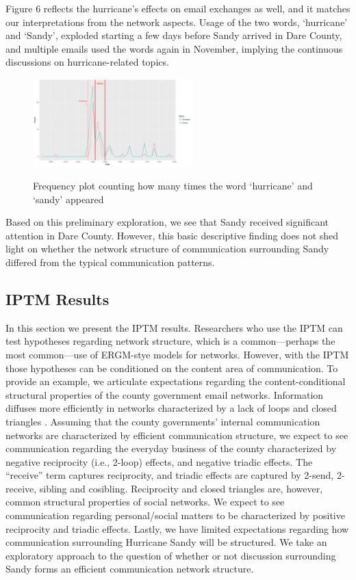 Figure 6 reflects the hurricane's effects on email exchanges as well, and it matches our interpretations from the network aspects. Usage of the two words, `hurricane' and `Sandy', exploded starting a few days before Sandy arrived in Dare County, and multiple emails used the words again in November, implying the continuous discussions on hurricane-related topics.
            \begin{figure}[H]
            	\centering
            	\includegraphics[width=0.55\textwidth]{plots/DareWord-1.png}  
            	\label{fig:WordDare}
            	\caption{Frequency plot counting how many times the word `hurricane' and `sandy' appeared}
            \end{figure}
   
  Based on this preliminary exploration, we see that Sandy received significant attention in Dare County. However, this basic descriptive finding does not shed light on whether the network structure of communication surrounding Sandy differed from the typical communication patterns. 
   \subsection{IPTM Results} \label{subsec: IPTM results}
  
  In this section we present the IPTM results. Researchers who use the IPTM can test hypotheses regarding network structure, which is a common---perhaps the most common---use of ERGM-stye models for networks. However, with the IPTM those hypotheses can be conditioned on the content area of communication. To provide an example, we articulate expectations regarding the content-conditional structural properties of the county government email networks. Information diffuses more efficiently in networks characterized by a lack of loops \citep{lin2010measuring,iribarren2011branching} and closed triangles \citep{roca2010topological,tadic2004information}. Assuming that the county governments' internal communication networks are characterized by efficient communication structure,  we expect to see communication regarding the everyday business of the county characterized by negative reciprocity (i.e., 2-loop) effects, and negative triadic effects. The ``receive'' term captures reciprocity, and triadic effects are captured by 2-send, 2-receive, sibling and cosibling. Reciprocity and closed triangles are, however, common structural properties of social networks. We expect to see communication regarding personal/social matters to be characterized by positive reciprocity and triadic effects. Lastly, we have limited expectations regarding how communication surrounding Hurricane Sandy will be structured. We take an exploratory approach to the question of whether or not discussion surrounding Sandy forms an efficient communication network structure.
  
